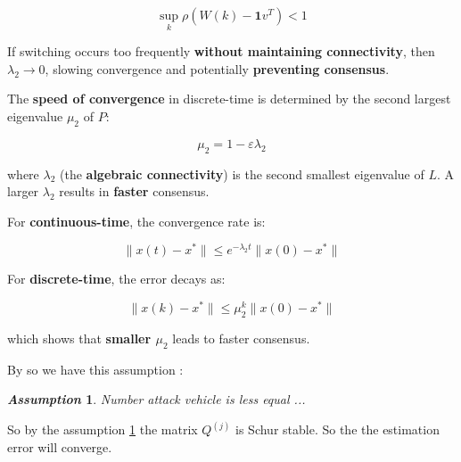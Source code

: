 \documentclass[letterpaper, 10pt, conference]{ieeeconf}  %
\newtheorem{remark}{\it Remark}%
\newtheorem{assumption}{\it Assumption}%
\begin{document}
\[
\sup_k \rho(W(k) - \mathbf{1} v^T) < 1
\]

If switching occurs too frequently \textbf{without maintaining connectivity}, then \( \lambda_2 \to 0 \), slowing convergence and potentially \textbf{preventing consensus}.





The \textbf{speed of convergence} in discrete-time is determined by the second largest eigenvalue $\mu_2$ of $P$: \cite{Consensus_discret_Saber}

\begin{equation}
    \mu_2 = 1 - \varepsilon \lambda_2
\end{equation}

where $\lambda_2$ (the \textbf{algebraic connectivity}) is the second smallest eigenvalue of $L$. A larger $\lambda_2$ results in \textbf{faster} consensus.

For \textbf{continuous-time}, the convergence rate is:

\begin{equation}
    \| x(t) - x^* \| \leq e^{-\lambda_2 t} \| x(0) - x^* \|
\end{equation}

For \textbf{discrete-time}, the error decays as:

\begin{equation}
    \| x(k) - x^* \| \leq \mu_2^k \| x(0) - x^* \|
\end{equation}

which shows that \textbf{smaller $\mu_2$} leads to faster consensus.

By so we have this assumption : 
\begin{assumption}\label{number_attack}
Number attack vehicle is less equal ...
\end{assumption}
So by the assumption \ref{number_attack} the matrix $Q^{(j)}$ is Schur stable. So the the estimation error will converge.

\end{document}
